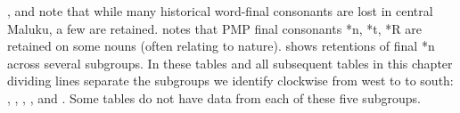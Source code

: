 \citet{Stresemann1927}, \citet{Collins1981,Collins1983}
and \citet{Blust1981} note that while many historical word-final
consonants are lost in central Maluku,
a few are retained.
\citet{Grimes2024} notes that PMP final consonants *n,
*t, *R are retained on some nouns (often relating to nature).
 shows retentions of final *n across several subgroups.
In these tables
and all subsequent tables in this chapter dividing lines separate
the subgroups we identify clockwise from west to  to south:
, , , , and .
Some tables do not have data from each of these five subgroups.

